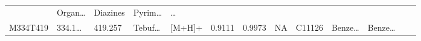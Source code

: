 \documentclass[
]{article}
\begin{document}
\begin{longtable}[]{@{}lllllllllllll@{}}
\begin{minipage}[t]{0.04\columnwidth}
\end{minipage} & \begin{minipage}[t]{0.05\columnwidth}\raggedright
Organ\ldots{}\strut
\end{minipage} & \begin{minipage}[t]{0.05\columnwidth}\raggedright
Diazines\strut
\end{minipage} & \begin{minipage}[t]{0.05\columnwidth}\raggedright
Pyrim\ldots{}\strut
\end{minipage} & \begin{minipage}[t]{0.02\columnwidth}\raggedright
\ldots{}\strut
\end{minipage}\tabularnewline
\begin{minipage}[t]{0.05\columnwidth}\raggedright
M334T419\strut
\end{minipage} & \begin{minipage}[t]{0.05\columnwidth}\raggedright
334.1\ldots{}\strut
\end{minipage} & \begin{minipage}[t]{0.05\columnwidth}\raggedright
419.257\strut
\end{minipage} & \begin{minipage}[t]{0.05\columnwidth}\raggedright
Tebuf\ldots{}\strut
\end{minipage} & \begin{minipage}[t]{0.05\columnwidth}\raggedright
{[}M+H{]}+\strut
\end{minipage} & \begin{minipage}[t]{0.07\columnwidth}\raggedright
0.9111\strut
\end{minipage} & \begin{minipage}[t]{0.07\columnwidth}\raggedright
0.9973\strut
\end{minipage} & \begin{minipage}[t]{0.05\columnwidth}\raggedright
NA\strut
\end{minipage} & \begin{minipage}[t]{0.04\columnwidth}\raggedright
C11126\strut
\end{minipage} & \begin{minipage}[t]{0.05\columnwidth}\raggedright
Benze\ldots{}\strut
\end{minipage} & \begin{minipage}[t]{0.05\columnwidth}\raggedright
Benze\ldots{}\strut
\end{minipage} & \begin{minipage}[t]{0.05\columnwidth}\raggedright

\end{minipage}
\end{longtable}
\end{document}
